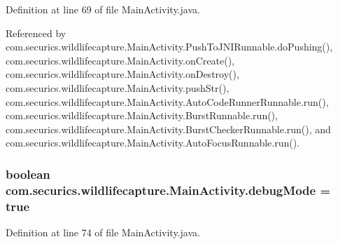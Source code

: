Definition at line 69 of file Main\+Activity.\+java.



Referenced by com.\+securics.\+wildlifecapture.\+Main\+Activity.\+Push\+To\+J\+N\+I\+Runnable.\+do\+Pushing(), com.\+securics.\+wildlifecapture.\+Main\+Activity.\+on\+Create(), com.\+securics.\+wildlifecapture.\+Main\+Activity.\+on\+Destroy(), com.\+securics.\+wildlifecapture.\+Main\+Activity.\+push\+Str(), com.\+securics.\+wildlifecapture.\+Main\+Activity.\+Auto\+Code\+Runner\+Runnable.\+run(), com.\+securics.\+wildlifecapture.\+Main\+Activity.\+Burst\+Runnable.\+run(), com.\+securics.\+wildlifecapture.\+Main\+Activity.\+Burst\+Checker\+Runnable.\+run(), and com.\+securics.\+wildlifecapture.\+Main\+Activity.\+Auto\+Focus\+Runnable.\+run().

\subsubsection[{debug\+Mode}]{\setlength{\rightskip}{0pt plus 5cm}boolean com.\+securics.\+wildlifecapture.\+Main\+Activity.\+debug\+Mode = true\hspace{0.3cm}{\ttfamily [static]}}\label{classcom_1_1securics_1_1wildlifecapture_1_1_main_activity_af683177dcc2165774be47543d1e4bb2c}


Definition at line 74 of file Main\+Activity.\+java.



